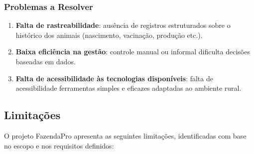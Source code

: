 \documentclass[12pt, a4paper]{article}
\begin{document}
\begin{spacing}{1.5}
\subsubsection{Problemas a Resolver}
\begin{enumerate}[label=\alph*)]
    \item \textbf{Falta de rastreabilidade}: ausência de registros estruturados sobre o histórico dos animais (nascimento, vacinação, produção etc.).
    \item \textbf{Baixa eficiência na gestão}: controle manual ou informal dificulta decisões baseadas em dados.
    \item \textbf{Falta de acessibilidade às tecnologias disponíveis}: falta de acessibilidade ferramentas simples e eficazes adaptadas ao ambiente rural\cite{uspDemocrata}.
\end{enumerate}

\subsection{Limitações}
\begin{spacing}{1.5}
O projeto FazendaPro apresenta as seguintes limitações, identificadas com base no escopo e nos requisitos definidos:


\end{spacing}
\end{spacing}
\end{document}
